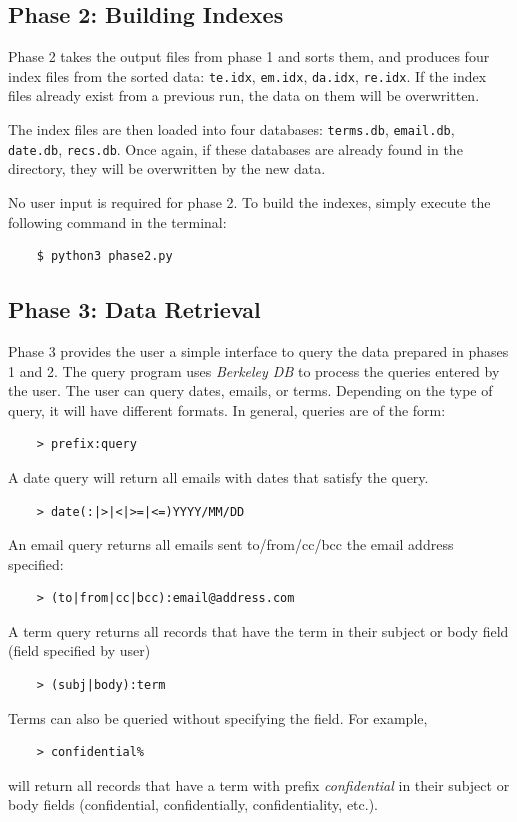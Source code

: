 \documentclass[11pt, a4paper]{article}
\begin{document}
{\subsection{Phase 2: Building Indexes}
Phase 2 takes the output files from phase 1 and sorts them, and produces four index files from the sorted data: \texttt{te.idx}, \texttt{em.idx}, \texttt{da.idx}, \texttt{re.idx}. If the index files already exist from a previous run, the data on them will be overwritten.

The index files are then loaded into four databases: \texttt{terms.db}, \texttt{email.db}, \texttt{date.db}, \texttt{recs.db}. Once again, if these databases are already found in the directory, they will be overwritten by the new data. 

No user input is required for phase 2. To build the indexes, simply execute the following command in the terminal:
\begin{lstlisting}
    $ python3 phase2.py
\end{lstlisting}
\subsection{Phase 3: Data Retrieval}
Phase 3 provides the user a simple interface to query the data prepared in phases 1 and 2. The query program uses \emph{Berkeley DB} to process the queries entered by the user. The user can query dates, emails, or terms. Depending on the type of query, it will have different formats. In general, queries are of the form:
\begin{lstlisting}
    > prefix:query
\end{lstlisting}

A date query will return all emails with dates that satisfy the query.
\begin{lstlisting}
    > date(:|>|<|>=|<=)YYYY/MM/DD
\end{lstlisting}

An email query returns all emails sent to/from/cc/bcc the email address specified:
\begin{lstlisting}
    > (to|from|cc|bcc):email@address.com
\end{lstlisting}

A term query returns all records that have the term in their subject or body field (field specified by user)
\begin{lstlisting}
    > (subj|body):term
\end{lstlisting}

Terms can also be queried without specifying the field. For example,
\begin{lstlisting}
    > confidential%
\end{lstlisting}
will return all records that have a term with prefix \emph{confidential} in their subject or body fields (confidential, confidentially, confidentiality, etc.).
 
}
\end{document}
